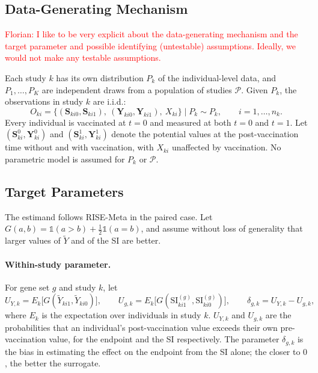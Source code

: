 \documentclass{article}
\begin{document}
\subsection*{Data-Generating Mechanism}


\textcolor{red}{Florian: I like to be very explicit about the data-generating mechanism and the target parameter and possible identifying (untestable) assumptions. Ideally, we would not make any testable assumptions.}

Each study $k$ has its own distribution $P_k$ of the individual-level data, and $P_1, \dots, P_K$ are independent draws from a population of studies $\mathcal{P}$. Given $P_k$, the observations in study $k$ are i.i.d.:
\[
O_{ki} = \big\{ (\boldsymbol{S}_{ki0}, \boldsymbol{S}_{ki1}),\ (\boldsymbol{Y}_{ki0}, \boldsymbol{Y}_{ki1}),\ X_{ki} \big\} \mid P_k \sim P_k, \qquad i = 1, \dots, n_k.
\]
Every individual is vaccinated at $t=0$ and measured at both $t= 0$ and $t=1$. Let $(\boldsymbol{S}^{0}_{ki}, \boldsymbol{Y}^{0}_{ki})$ and $(\boldsymbol{S}^{1}_{ki}, \boldsymbol{Y}^{1}_{ki})$ denote the potential values at the post-vaccination time without and with vaccination, with $X_{ki}$ unaffected by vaccination. No parametric model is assumed for $P_k$ or $\mathcal{P}$.

\subsection*{Target Parameters}

The estimand follows RISE-Meta in the paired case. Let $G(a,b) = \mathds{1}(a > b) + \tfrac12 \mathds{1}(a = b)$, and assume without loss of generality that larger values of $\tilde{Y}$ and of the SI are better.

\paragraph{Within-study parameter.} For gene set $g$ and study $k$, let
\[
U_{Y,k} = E_k\big[ G(\tilde{Y}_{ki1}, \tilde{Y}_{ki0}) \big], \qquad
U_{g,k} = E_k\big[ G(\mathrm{SI}^{(g)}_{ki1}, \mathrm{SI}^{(g)}_{ki0}) \big], \qquad
\delta_{g,k} = U_{Y,k} - U_{g,k},
\]
where $E_k$ is the expectation over individuals in study $k$. $U_{Y,k}$ and $U_{g,k}$ are the probabilities that an individual's post-vaccination value exceeds their own pre-vaccination value, for the endpoint and the SI respectively. The parameter $\delta_{g,k}$ is the bias in estimating the effect on the endpoint from the SI alone; the closer to $0$, the better the surrogate.
\end{document}
